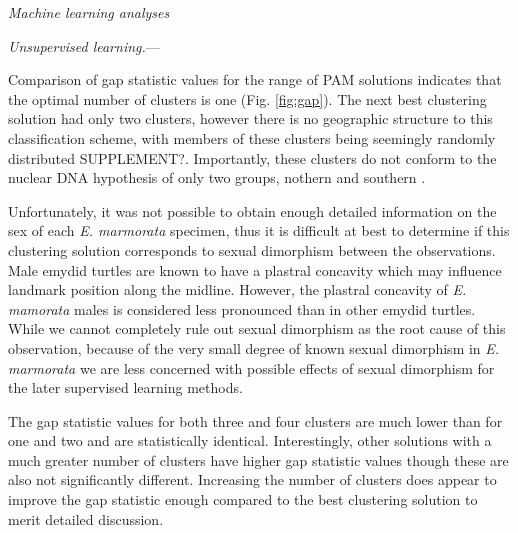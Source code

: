 \documentclass[12pt,letterpaper]{article}\usepackage{graphicx, color}
\renewcommand{\subsection}[1]{%
\bigskip
\begin{center}
\begin{large}
\normalfont\itshape #1
\end{large}
\end{center}}
\renewcommand{\subsubsection}[1]{%
\vspace{2ex}
\noindent
\textit{#1.}---}
\begin{document}
\subsection{Machine learning analyses}
\subsubsection{Unsupervised learning}

Comparison of gap statistic values for the range of PAM solutions indicates that the optimal number of clusters is one (Fig. \ref{fig:gap}). The next best clustering solution had only two clusters, however there is no geographic structure to this classification scheme, with members of these clusters being seemingly randomly distributed SUPPLEMENT?. Importantly, these clusters do not conform to the nuclear DNA hypothesis of only two groups, nothern and southern \citep{Spinks2010}.

Unfortunately, it was not possible to obtain enough detailed information on the sex of each \textit{E. marmorata} specimen, thus it is difficult at best to determine if this clustering solution corresponds to sexual dimorphism between the observations. Male emydid turtles are known to have a plastral concavity which may influence landmark position along the midline. However, the plastral concavity of \textit{E. mamorata} males is considered less pronounced than in other emydid turtles. While we cannot completely rule out sexual dimorphism as the root cause of this observation, because of the very small degree of known sexual dimorphism in \textit{E. marmorata} we are less concerned with possible effects of sexual dimorphism for the later supervised learning methods. 

The gap statistic values for both three and four clusters are much lower than for one and two and are statistically identical. Interestingly, other solutions with a much greater number of clusters have higher gap statistic values though these are also not significantly different. Increasing the number of clusters does appear to improve the gap statistic enough compared to the best clustering solution to merit detailed discussion.
\end{document}

